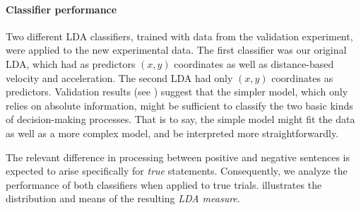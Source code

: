 \documentclass[draft]{article}
\begin{document}
\paragraph{Classifier performance}
Two different LDA classifiers, trained with data from the validation experiment, were applied to the new experimental data. The first classifier was our original LDA, which had as predictors $(x,y)$ coordinates as well as distance-based velocity and acceleration. The second LDA had only $(x,y)$ coordinates as predictors. Validation results (see ) suggest that the simpler model, which only relies on absolute information, might be sufficient to classify the two basic kinds of decision-making processes. That is to say, the simple model might fit the data as well as a more complex model, and be interpreted more straightforwardly. 

The relevant difference in processing between positive and negative sentences is expected to arise specifically for \emph{true} statements. Consequently, we analyze the performance of both classifiers when applied to true trials.  illustrates the distribution and means of the resulting \textit{LDA measure}. 
\end{document}
